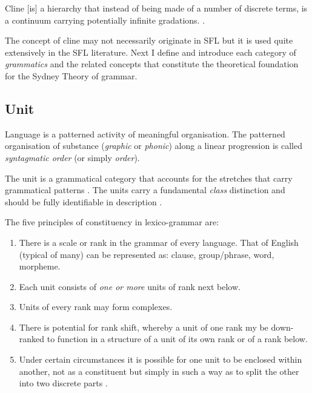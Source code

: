 \begin{definition}[Cline]\label{def:cline}
	Cline [is] a hierarchy that instead of being made of a number of discrete terms, is a continuum carrying potentially infinite gradations.
	\citep[42]{Halliday2002}. 
\end{definition}

The concept of cline may not necessarily originate in SFL but it is used quite extensively in the SFL literature.
Next I define and introduce each category of \textit{grammatics} and the related concepts that constitute the theoretical foundation for the Sydney Theory of grammar.

\subsection{Unit}
\label{sec:unit-sydney}
Language is a patterned activity of meaningful organisation. The patterned organisation of substance (\textit{graphic} or \textit{phonic}) along a linear progression is called \textit{syntagmatic order} (or simply \textit{order}). 

\begin{definition}[Unit]\label{def:unit}
	The unit is a grammatical category that accounts for the stretches that carry grammatical patterns \citep[42]{Halliday2002}.
	The units carry a fundamental \textit{class} distinction and should be fully identifiable in description \citep[45]{Halliday2002}.
\end{definition}

\begin{generalization}\label{def:constituency-principles}
	The five principles of constituency in lexico-grammar are:
	\begin{enumerate}
		\item There is a scale or rank in the grammar of every language. That of English (typical of many) can be represented as: clause, group/phrase, word, morpheme.
		\item Each unit consists of \textit{one or more} units of rank next below.
		\item Units of every rank may form complexes.
		\item\label{item:downrank} There is potential for rank shift, whereby a unit of one rank my be down-ranked to function in a structure of a unit of its own rank or of a rank below.
		\item\label{item:unit-split} Under certain circumstances it is possible for one unit to be enclosed within another, not as a constituent but simply in such a way as to split the other into two discrete parts \citep[9--10]{Halliday2013}.
	\end{enumerate}
\end{generalization}

